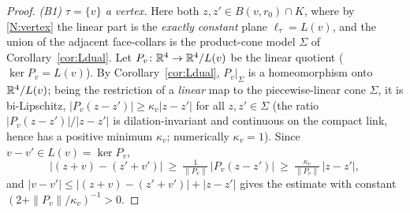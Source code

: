 \begin{proof}
\smallskip\noindent\emph{(B1) $\tau=\{v\}$ a vertex.} Here both $z,z'\in B(v,r_0)\cap
K$, where by \ref{N:vertex} the linear part is the \emph{exactly constant} plane
$\ell_\tau=L(v)$, and the union of the adjacent face-collars is the product-cone model
$\Sigma$ of Corollary~\ref{cor:Ldual}. Let $P_v\colon\mathbb{R}^4\to\mathbb{R}^4/L(v)$ be the
linear quotient ($\ker P_v=L(v)$). By Corollary~\ref{cor:Ldual}, $P_v|_\Sigma$ is a
homeomorphism onto $\mathbb{R}^4/L(v)$; being the restriction of a \emph{linear} map to the
piecewise-linear cone $\Sigma$, it is bi-Lipschitz, $|P_v(z-z')|\ge\kappa_v|z-z'|$ for
all $z,z'\in\Sigma$ (the ratio $|P_v(z-z')|/|z-z'|$ is dilation-invariant and
continuous on the compact link, hence has a positive minimum $\kappa_v$; numerically
$\kappa_v=1$). Since $v-v'\in L(v)=\ker P_v$,
\[
|(z+v)-(z'+v')|\ \ge\ \tfrac1{\|P_v\|}\,|P_v(z-z')|\ \ge\ \tfrac{\kappa_v}{\|P_v\|}\,|z-z'| ,
\]
and $|v-v'|\le|(z+v)-(z'+v')|+|z-z'|$ gives the estimate with constant
$(2+\|P_v\|/\kappa_v)^{-1}>0$.


\end{proof}

